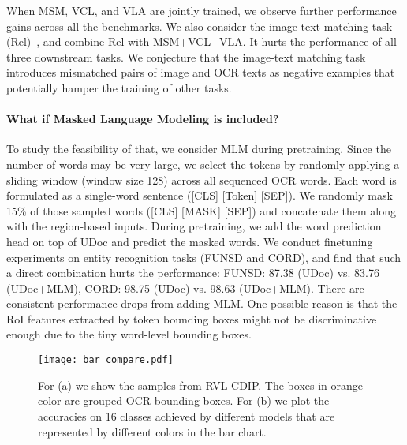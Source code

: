 \documentclass{article}
\begin{document}
When MSM, VCL, and VLA are jointly trained, we observe {further} performance gain{s} across all the benchmarks.
	{We also consider the image-text {matching} task (Rel)~\cite{xu2020layoutlmv2}, and combine Rel with MSM+VCL+VLA}. It hurts the performance of all three downstream tasks.
	{We conjecture that the} image-text matching {task} introduce{s} {mismatched pairs of} image and OCR texts as negative examples {that potentially hamper} the training of other tasks.
	
	\paragraph{What if Masked Language Modeling is included?}
	{To {study the feasibility of that}, we consider MLM during pretraining. Since the number of words may be very {large}, we select the tokens by randomly applying a sliding window (window size 128) across all sequenced OCR words. Each word is formulated as a single-word sentence ([CLS] [Token] [SEP]). We randomly mask 15\% of those sampled words ([CLS] [MASK] [SEP]) and concatenate them along with the region-based inputs. During pretraining, we add the word prediction head on top of UDoc and predict the masked words. We conduct finetuning experiments on entity recognition tasks (FUNSD and CORD), and find that such a direct combination hurts the performance: FUNSD: 87.38 (UDoc) vs. 83.76 (UDoc+MLM), CORD: 98.75 (UDoc) vs. 98.63 (UDoc+MLM). There are consistent performance drops from adding MLM. One possible reason is that the RoI features extracted by token bounding boxes might not be discriminative enough due to the tiny word-level bounding boxes}.
	
	\begin{figure*}[t!]
		\begin{center}
			\texttt{[image: bar\_compare.pdf]}
		\end{center}
		\vspace{-3mm}
		\caption{For (a) we show the samples from RVL-CDIP. The boxes in orange color are grouped OCR bounding boxes. For (b) we plot the accuracies on 16 classes achieved by different models that are represented by different colors in the bar chart.}
		\vspace{-6mm}
		\label{fig.doccls_samples}
	\end{figure*}
	
\end{document}
